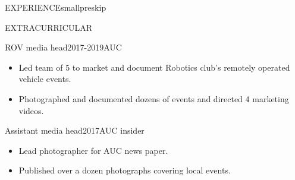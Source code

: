 \documentclass{resume}
\begin{document}
\begin{minipage}[t]{0.44\textwidth}
\begin{rsection}{\MakeUppercase{experience}}{smallpreskip}
	\end{rsection}

	\begin{rsection}{\MakeUppercase{extracurricular}}{}

		\begin{rcontent}{ROV media head}{2017-2019}{AUC}
			\begin{itemize}
				\item Led team of 5 to market and document Robotics club's remotely operated vehicle events.
				\item Photographed and documented dozens of events and directed 4 marketing videos.
			\end{itemize}
		\end{rcontent}
		\divider
		\begin{rcontent}{Assistant media head}{2017}{AUC insider}
			\begin{itemize}
				\item Lead photographer for AUC news paper.
				\item Published over a dozen photographs covering local events.
			\end{itemize}
		\end{rcontent}

	\end{rsection}

\end{minipage}
\end{document}
